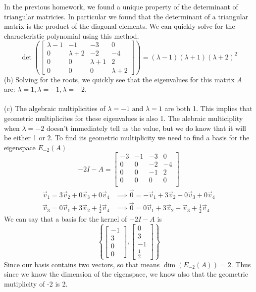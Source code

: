 \documentclass{report}
\begin{document}
In the previous homework, we found a unique property of the determinant of triangular matricies. In particular we found that the determinant of a triangular matrix is the product of the diagonal elements. We can quickly solve for the characteristic polynomial using this method.
$$
\det\left(
\begin{bmatrix}
\lambda-1&-1&-3&0\\
0&\lambda+2&-2&-4\\
0&0&\lambda+1&2\\
0&0&0&\lambda+2
\end{bmatrix}
\right) =
(\lambda-1)(\lambda+1)(\lambda+2)^2
$$
(b) Solving for the roots, we quickly see that the eigenvalues for this matrix $A$ are: $\lambda = 1, \lambda = -1, \lambda = -2$. \\
\\
\noindent (c) The algebraic multiplicities of $\lambda = -1 \text{ and } \lambda = 1$ are both 1. This implies that geometric multiplicites for these eigenvalues is also 1.  The alebraic multiciplity when $\lambda = -2$ doesn't immediately tell us the value,  but we do know that it will be either 1 or 2.  To find its geometric multiplicity we need to find a basis for the eigenspace $E_{-2}(A)$
$$
-2I - A = 
\begin{bmatrix}
-3&-1&-3&0\\
0&0&-2&-4\\
0&0&-1&2\\
0&0&0&0\\
\end{bmatrix}
$$
$$
\begin{aligned}
\vec{v}_1 = 3\vec{v}_2 + 0\vec{v}_3 + 0\vec{v}_4 &\implies \vec{0} = -\vec{v}_1 + 3\vec{v}_2 + 0\vec{v}_3 + 0\vec{v}_4  \\
\vec{v}_3 = 0\vec{v}_1 + 3\vec{v}_2 + \frac{1}{2}\vec{v}_4 &\implies \vec{0} = 0\vec{v}_1 + 3\vec{v}_2 -\vec{v}_3+\frac{1}{2}\vec{v}_4
\end{aligned}
$$
We can say that a basis for the kernel of $-2I-A$ is
$$
\left\{
\begin{bmatrix}-1\\3\\0\\0\end{bmatrix},\begin{bmatrix}0\\3\\-1\\\frac{1}{2}\end{bmatrix}
\right\}
$$
Since our basis contains two vectors,  so that means $\dim(E_{-2}(A)) = 2$.  Thus since we know the dimension of the eigenspace,  we know also that the geometric mutiplicity of -2 is 2. \\
\end{document}
